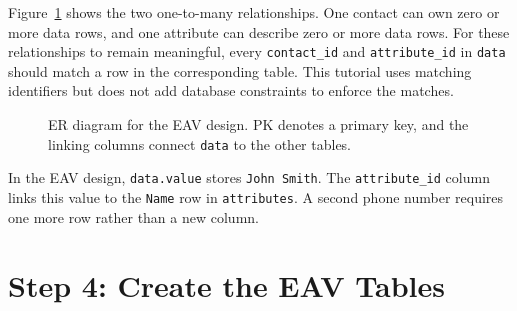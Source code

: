 \documentclass[11pt]{article}
\begin{document}
Figure~\ref{fig:contacts-er} shows the two one-to-many relationships. One
contact can own zero or more data rows, and one attribute can describe zero
or more data rows. For these relationships to remain meaningful, every
\texttt{contact\_id} and \texttt{attribute\_id} in \texttt{data} should match a row
in the corresponding table. This tutorial uses matching identifiers but does
not add database constraints to enforce the matches.

\begin{figure}[htbp]
\centering
{}
\caption{ER diagram for the EAV design. PK denotes a primary
key, and the linking columns connect \texttt{data} to the other tables.}
\label{fig:contacts-er}
\end{figure}

In the EAV design, \texttt{data.value} stores \texttt{John Smith}. The
\texttt{attribute\_id} column links this value to the \texttt{Name} row in
\texttt{attributes}. A second phone number requires one more row rather than a
new column.

\section*{Step 4: Create the EAV Tables}
\end{document}
